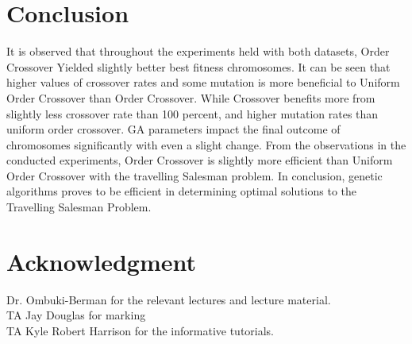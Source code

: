 \documentclass[conference]{IEEEtran}
\begin{document}




\section{Conclusion}
It is observed that throughout the experiments held with both datasets, Order Crossover Yielded slightly better best fitness chromosomes. It can be seen that higher values of crossover rates and some mutation is more beneficial to Uniform Order Crossover than Order Crossover. While Crossover benefits more from slightly less crossover rate than 100 percent, and higher mutation rates than uniform order crossover. GA parameters impact the final outcome of chromosomes significantly with even a slight change. From the observations in the conducted experiments, Order Crossover is slightly more efficient than Uniform Order Crossover with the travelling Salesman problem. In conclusion, genetic algorithms proves to be efficient in determining optimal solutions to the Travelling Salesman Problem. 






\section*{Acknowledgment}
Dr. Ombuki-Berman for the relevant lectures and lecture material.\\
TA Jay Douglas for marking\\
TA Kyle Robert Harrison for the informative tutorials.





\end{document}
